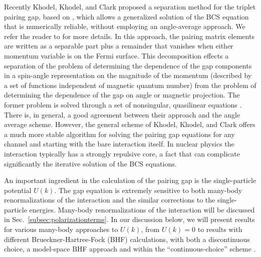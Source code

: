 \documentclass[rmp,aps,floatfix]{revtex4}
\begin{document}
Recently  Khodel, Khodel, and Clark \cite{kkc2001,kkc1998} proposed a
separation method for the triplet pairing gap, based on \cite{kkc96},
which allows a generalized solution of 
the BCS equation that is numerically reliable, 
without employing an angle-average approach.
We refer the reader to \cite{kkc96,kkc2001,kkc1998} for more details.
In this approach, the pairing matrix elements are written as a separable
part plus a remainder that vanishes when either momentum variable is on the
Fermi surface.  This decomposition effects a separation of the problem
of determining the dependence of the gap components in a spin-angle
representation on the magnitude of the momentum (described by a set of
functions independent of magnetic quantum number) from the problem of
determining the dependence of the gap on angle or magnetic projection.
The former problem is solved through a set of nonsingular, quasilinear
equations \cite{kkc2001,kkc1998}. 
There is, in general, a good agreement between their approach and the angle 
average scheme. However, the general scheme of Khodel, Khodel, and Clark
offers a much more stable algorithm 
for solving the pairing gap equations for 
any channel and starting with the bare interaction itself. In nuclear physics
the interaction typically has a strongly repulsive core, a fact  
that can complicate
significantly the iterative solution of the BCS equations.

An important ingredient in the calculation of the pairing gap is
the single-particle potential $U(k)$. The gap equation 
is extremely sensitive to both many-body renormalizations of the 
interaction and the similar corrections to the single-particle 
energies. Many-body renormalizations of the interaction will be 
discussed in Sec.~\ref{subsec:polarizationterms}. 
In our discussion below, we will present results for various
many-body approaches to $U(k)$, from $U(k)=0$ to results with  
different Brueckner-Hartree-Fock (BHF) calculations, with both a
discontinuous choice, a model-space BHF approach and  
within the ``continuous-choice'' scheme \cite{jjm76}.
\end{document}
